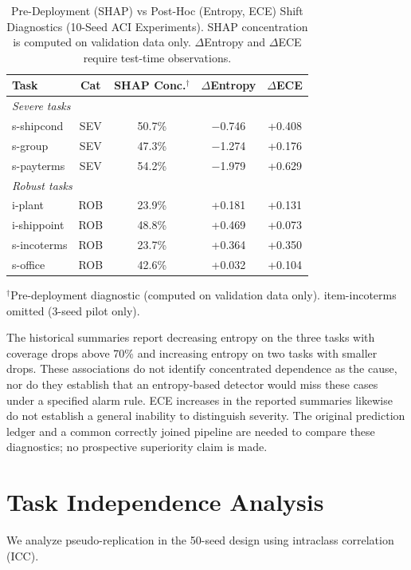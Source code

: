 \documentclass[accepted]{uai2026} %
\begin{document}
\begin{table}[htbp]
\centering
\caption{Pre-Deployment (SHAP) vs Post-Hoc (Entropy, ECE) Shift Diagnostics (10-Seed ACI Experiments). SHAP concentration is computed on validation data only. $\Delta$Entropy and $\Delta$ECE require test-time observations.}\label{tab:baselines}
\small
\begin{tabular}{@{}lcccc@{}}
\toprule
Task & Cat & SHAP Conc.$^\dagger$ & $\Delta$Entropy & $\Delta$ECE \\
\midrule
\multicolumn{5}{l}{\textit{Severe tasks}} \\
s-shipcond & SEV & 50.7\% & $-$0.746 & +0.408 \\
s-group & SEV & 47.3\% & $-$1.274 & +0.176 \\
s-payterms & SEV & 54.2\% & $-$1.979 & +0.629 \\
\midrule
\multicolumn{5}{l}{\textit{Robust tasks}} \\
i-plant & ROB & 23.9\% & +0.181 & +0.131 \\
i-shippoint & ROB & 48.8\% & +0.469 & +0.073 \\
s-incoterms & ROB & 23.7\% & +0.364 & +0.350 \\
s-office & ROB & 42.6\% & +0.032 & +0.104 \\
\bottomrule
\end{tabular}


\raggedright
\footnotesize
$^\dagger$Pre-deployment diagnostic (computed on validation data only). item-incoterms omitted (3-seed pilot only).
\end{table}

The historical summaries report decreasing entropy on the three tasks with coverage drops above 70\% and increasing entropy on two tasks with smaller drops. These associations do not identify concentrated dependence as the cause, nor do they establish that an entropy-based detector would miss these cases under a specified alarm rule. ECE increases in the reported summaries likewise do not establish a general inability to distinguish severity. The original prediction ledger and a common correctly joined pipeline are needed to compare these diagnostics; no prospective superiority claim is made.

\section{Task Independence Analysis}\label{app:icc}

We analyze pseudo-replication in the 50-seed design using intraclass correlation (ICC).
\end{document}
